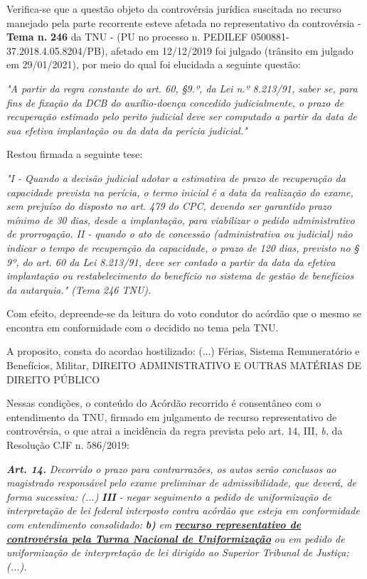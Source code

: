 \documentclass[12pt]{article}
\begin{document}
\justifying
\noindent Verifica-se que a questão objeto da controvérsia jurídica suscitada no recurso manejado pela parte recorrente esteve afetada no representativo da controvérsia - \textbf{Tema n. }\textbf{246} da TNU - (PU no processo n. PEDILEF 0500881-37.2018.4.05.8204/PB),  afetado em 12/12/2019 foi julgado (trânsito em julgado em 29/01/2021), por meio do qual foi elucidada a seguinte questão:

\noindent \textit{"A partir da regra constante do art. 60, §9.º, da Lei n.º 8.213/91, saber se, para fins de fixação da DCB do auxílio-doença concedido judicialmente, o prazo de recuperação estimado pelo perito judicial deve ser computado a partir da data de sua efetiva implantação ou da data da perícia judicial."}

\noindent Restou firmada a seguinte tese:

\noindent \textit{"I - Quando a decisão judicial adotar a estimativa de prazo de recuperação da capacidade prevista na perícia, o termo inicial é a data da realização do exame, sem prejuízo do disposto no art. 479 do CPC, devendo ser garantido prazo mínimo de 30 dias, desde a implantação, para viabilizar o pedido administrativo de prorrogação. II - quando o ato de concessão (administrativa ou judicial) não indicar o tempo de recuperação da capacidade, o prazo de 120 dias, previsto no § 9º, do art. 60 da Lei 8.213/91, deve ser contado a partir da data da efetiva implantação ou restabelecimento do benefício no sistema de gestão de benefícios da autarquia." (Tema 246 TNU).}

\noindent Com efeito, depreende-se da leitura do voto condutor do acórdão que o mesmo se encontra em conformidade com o decidido no  tema pela TNU.

\noindent A proposito, consta do acordao hostilizado: (...) Férias, Sistema Remuneratório e Benefícios, Militar, DIREITO ADMINISTRATIVO E OUTRAS MATÉRIAS DE DIREITO PÚBLICO

\noindent Nessas condições, o conteúdo do Acórdão recorrido é consentâneo com o entendimento da TNU, firmado em julgamento de recurso representativo de controvérsia, o que atrai a incidência da regra prevista pelo art. 14, III, \textit{b,} da Resolução CJF n. 586/2019:

\noindent \textit{\textbf{Art. 14.}}\textit{ Decorrido o prazo para contrarrazões, os autos serão conclusos ao magistrado responsável pelo exame preliminar de admissibilidade, que deverá, de forma sucessiva: (...) }\textit{\textbf{III }}\textit{- negar seguimento a pedido de uniformização de interpretação de lei federal interposto contra acórdão que esteja em conformidade com entendimento consolidado: }\textit{\textbf{b)}}\textit{ em }\uline{\textit{\textbf{recurso representativo de controvérsia pela Turma Nacional de Uniformização}}}\textit{ ou em pedido de uniformização de interpretação de lei dirigido ao Superior Tribunal de Justiça;(...).}
\end{document}
